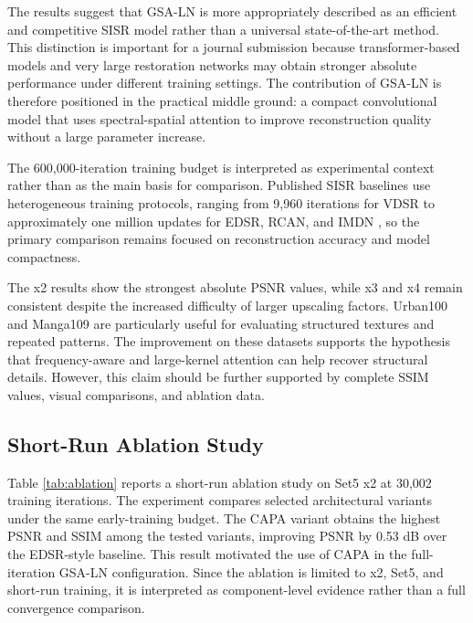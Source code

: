 \documentclass[conference]{IEEEtran}
\begin{document}
The results suggest that GSA-LN is more appropriately described as an efficient and competitive SISR model rather than a universal state-of-the-art method. This distinction is important for a journal submission because transformer-based models and very large restoration networks may obtain stronger absolute performance under different training settings. The contribution of GSA-LN is therefore positioned in the practical middle ground: a compact convolutional model that uses spectral-spatial attention to improve reconstruction quality without a large parameter increase.

The 600,000-iteration training budget is interpreted as experimental context rather than as the main basis for comparison. Published SISR baselines use heterogeneous training protocols, ranging from 9,960 iterations for VDSR to approximately one million updates for EDSR, RCAN, and IMDN \cite{kim2016vdsr,lim2017edsr,zhang2018rcan,hui2019imdn}, so the primary comparison remains focused on reconstruction accuracy and model compactness.

The x2 results show the strongest absolute PSNR values, while x3 and x4 remain consistent despite the increased difficulty of larger upscaling factors. Urban100 and Manga109 are particularly useful for evaluating structured textures and repeated patterns. The improvement on these datasets supports the hypothesis that frequency-aware and large-kernel attention can help recover structural details. However, this claim should be further supported by complete SSIM values, visual comparisons, and ablation data.

\subsection{Short-Run Ablation Study}

Table \ref{tab:ablation} reports a short-run ablation study on Set5 x2 at 30,002 training iterations. The experiment compares selected architectural variants under the same early-training budget. The CAPA variant obtains the highest PSNR and SSIM among the tested variants, improving PSNR by 0.53 dB over the EDSR-style baseline. This result motivated the use of CAPA in the full-iteration GSA-LN configuration. Since the ablation is limited to x2, Set5, and short-run training, it is interpreted as component-level evidence rather than a full convergence comparison.
\end{document}
